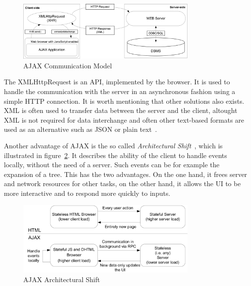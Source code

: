 \begin{figure}[h]
	\begin{center}
		\includegraphics[width=0.8\textwidth]{./img/ajax01.png}
		\caption{AJAX Communication Model}
		\label{fig:ajax01}
	\end{center}
\end{figure}

The XMLHttpRequest is an API, implemented by the browser. It is 
used to handle the communication with the server in an asynchronous fashion using a
simple HTTP connection. It is worth mentioning that other solutions also exists. 
XML is often used to transfer data between the server and the client, 
altought XML is not required for data interchange and often other text-based
formats are used as an alternative such as JSON or plain text~\cite{bajax1}.

Another advantage of AJAX is the so called \textit{Architectural Shift}~\cite{wgdd1}, 
which is illustrated in figure~\ref{fig:ajax02}. 
It describes the ability of the client to handle events
locally, without the need of a server. Such events can be for example the
expansion of a tree. This has the two advantages. On the one hand, it frees server 
and network resources for other tasks, on the other hand, it allows
the UI to be more interactive and to respond more quickly to inputs.

\begin{figure}[h]
	\begin{center}
		\includegraphics[width=0.8\textwidth]{./img/ajax02.png}
		\caption{AJAX Architectural Shift}
		\label{fig:ajax02}
	\end{center}
\end{figure}

